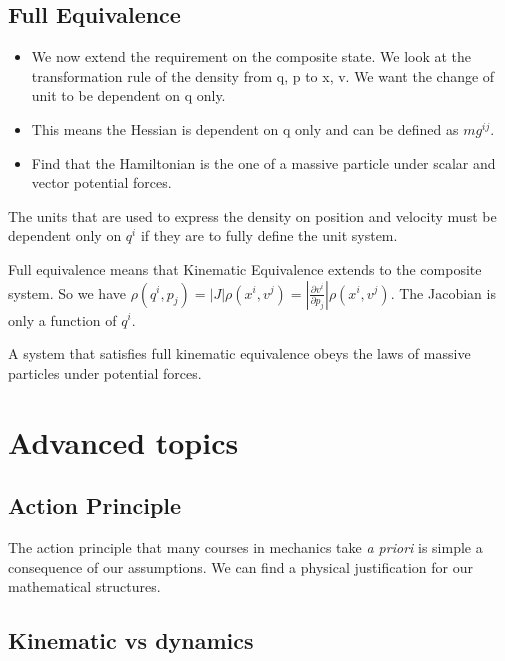 \documentclass{article}
\begin{document}
\subsection{Full Equivalence}

\begin{itemize}
	\item We now extend the requirement on the composite state. We look at the transformation rule of the density from q, p to x, v. We want the change of unit to be dependent on q only.
	
	\item This means the Hessian is dependent on q only and can be defined as $m g^{ij}$.
	
	\item Find that the Hamiltonian is the one of a massive particle under scalar and vector potential forces.
\end{itemize}

The units that are used to express the density on position and velocity must be dependent only on $q^i$ if they are to fully define the unit system.

\begin{defn}
	Full equivalence means that Kinematic Equivalence extends to the composite system. So we have $\rho(q^i,p_j) = \left|J\right|\rho(x^i,v^j) = \left|\frac{\partial v^i}{\partial p_j}\right|\rho(x^i,v^j)$. The Jacobian is only a function of $q^i$.
\end{defn}

\begin{prop}
	A system that satisfies full kinematic equivalence obeys the laws of massive particles under potential forces.
\end{prop}

\section{Advanced topics}

\subsection{Action Principle}

The action principle that many courses in mechanics take \emph{a priori} is simple a consequence of our assumptions. We can find a physical justification for our mathematical structures.

\subsection{Kinematic vs dynamics}
\end{document}
